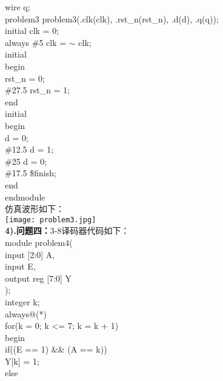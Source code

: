 \documentclass[12pt]{ctexart}
\begin{document}
wire q;\\
problem3 problem3(.clk(clk), .rst\_n(rst\_n), .d(d), .q(q));\\
initial clk = 0;\\
always \#5 clk = $\sim$ clk;\\
initial\\
begin\\
\hspace*{0.5cm}rst\_n = 0;\\
\hspace*{0.5cm}\#27.5 rst\_n = 1; \\
end\\
initial\\
begin\\
\hspace*{0.5cm}d = 0;\\
\hspace*{0.5cm}\#12.5 d = 1;\\
\hspace*{0.5cm}\#25 d = 0;\\
\hspace*{0.5cm}\#17.5 \$finish;\\
end\\
endmodule\\
仿真波形如下：\\
\texttt{[image: problem3.jpg]}\\
{\bf4).问题四：}3-8译码器代码如下：\\
module problem4(\\
\hspace*{0.5cm}input [2:0] A,\\
\hspace*{0.5cm}input E,\\
\hspace*{0.5cm}output reg [7:0] Y\\
);\\
integer k;\\
always@(*)\\
\hspace*{0.5cm}for(k = 0; k <= 7; k = k + 1)\\
\hspace*{0.5cm}begin\\
\hspace*{1cm}if((E == 1) \&\& (A == k))\\
\hspace*{1.5cm}Y[k] = 1;\\
\hspace*{1cm}else\\
\end{document}
